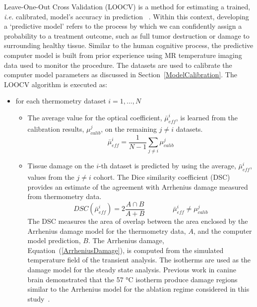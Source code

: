 \documentclass[12pt]{article}
\newcommand{\eqn}[1]{(\ref{#1})}
\begin{document}
Leave-One-Out Cross Validation (LOOCV) is a method for estimating a
trained, \textit{i.e.} calibrated, model's accuracy in prediction ~\cite{Stone1974,Geisser1975,Kohavi1995,Browne2000,Arlot2010}.
Within this context, developing a `predictive model' refers to the process by which we
can confidently assign a probability to a treatment outcome, such as full tumor
destruction or damage to surrounding healthy tissue. 
Similar to the human cognitive process, the predictive computer model is built
from prior experience using MR temperature imaging data used to monitor the
procedure. The datasets are used to calibrate the computer model parameters as
discussed in Section~\ref{ModelCalibration}. The LOOCV algorithm is executed as: 
\begin{itemize}
\item for each thermometry dataset $i = 1, ..., N$
\begin{itemize}
\item  The average value for the optical coefficient, $\bar{\mu}_\textit{eff}^i$, 
is learned from the calibration results, $\mu_\textit{calib}^j$,
on the remaining $j \neq i$ datasets.
\[
   \bar{\mu}_\textit{eff}^i = \frac{1}{N-1} \sum_{j \neq i} \mu_\textit{calib}^j
\]
\item 
Tissue damage on the 
$i$-th dataset is predicted by using the average, $\bar{\mu}_\textit{eff}^i$, 
values from the $j \neq i$ cohort. 
The Dice similarity coefficient (DSC) provides an estimate of the agreement
with Arrhenius damage measured from thermometry data.
\[
   DSC(\bar{\mu}_\textit{eff}^i)   
    = 2 \frac{A \cap B}{A+B}
   \qquad \qquad 
   \bar{\mu}_\textit{eff}^i \neq \mu_\textit{calib}^j
\]
The DSC measures the area of overlap between
the area enclosed by the Arrhenius damage model for the thermometry data, $A$, and the
computer model prediction, $B$. 
The Arrhenius damage, Equation~\eqn{ArrheniusDamage}, is computed
from the simulated temperature field of the transient analysis. The isotherms
are used as the damage model for the steady state analysis.
Previous work in canine
brain demonstrated that the 57 \si{\degreeCelsius} isotherm produce damage regions similar
to the Arrhenius model for the ablation regime considered
in this study~\cite{yung2010quantitative}.
\end{itemize}
\end{itemize}
\end{document}
